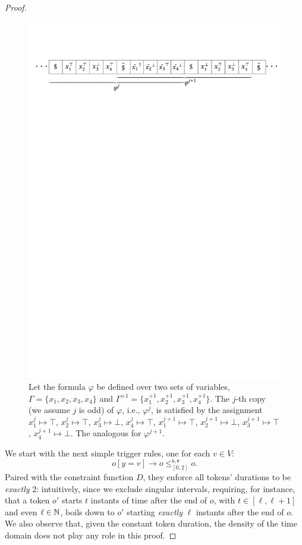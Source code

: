 \begin{proof}
\begin{figure}[t]
    \includegraphics[width=\textwidth]{Chaps/Timelines/Psp.pdf}
    \caption{Let
    the formula $\varphi$ be defined over two sets of variables, $\Gamma=\{x_1,x_2,x_3,x_4\}$ and $\Gamma^{+1}=\{x_1^{+1},x_2^{+1},x_3^{+1},x_4^{+1}\}$. 
    The $j$-th copy (we assume $j$ is odd) of $\varphi$, i.e., $\varphi^j$, is satisfied by the assignment $x_1^j\mapsto \top$, $x_2^j\mapsto \top$, $x_3^j\mapsto \bot$, $x_4^j\mapsto \top$, $x_1^{j+1}\mapsto \top$, $x_2^{j+1}\mapsto \bot$, $x_3^{j+1}\mapsto \top$, $x_4^{j+1}\mapsto \bot$. The analogous for $\varphi^{j+1}$. }
    \label{fig:phij}
\end{figure}

We start with the next simple trigger rules, one for each $v\in V$: 
\[o[y=v]\to o\leq^{\mathsf{s},\mathsf{e}}_{[0,2]} o.\]
Paired with the constraint function $D$, they enforce
all tokens' durations to be \emph{exactly} 2: intuitively, since we exclude singular intervals, requiring, for instance, that a token $o'$ starts  $t$ instants of time after the end of $o$, with $t\in [\ell,\ell+1]$ and even $\ell\in\mathbb{N}$, boils down to $o'$ starting \emph{exactly} $\ell$ instants after the end of $o$. We also observe that, given the constant token duration, the density of the time domain does not play any role in this proof.


\end{proof}
